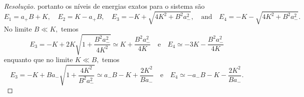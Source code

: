 \begin{proof}[Resolução]
   portanto os níveis de energias exatos para o sistema são
   \begin{equation*}
       E_1 = a_+B + K,\quad
       E_2 = K - a_+B,\quad
       E_3 = - K + \sqrt{4K^2 + B^2 a_-^2},\quad\text{and}\quad
       E_4 = - K - \sqrt{4K^2 + B^2 a_-^2}.
   \end{equation*}
   No limite \(B \ll K,\) temos 
   \begin{equation*}
      E_3 = - K + 2K \sqrt{1 + \frac{B^2 a_-^2}{4K^2}} \simeq K + \frac{B^2a_-^2}{4K}
      \quad\text{e}\quad
      E_4 \simeq - 3K - \frac{B^2 a_-^2}{4K}
   \end{equation*}
   enquanto que no limite \(K \ll B,\) temos
   \begin{equation*}
      E_3 = - K + B a_- \sqrt{1 + \frac{4 K^2}{B^2 a_-^2}} \simeq a_- B - K + \frac{2K^2}{B a_-}
      \quad\text{e}\quad
      E_4 \simeq -a_- B - K - \frac{2K^2}{B a_-}.
   \end{equation*}


\end{proof}
